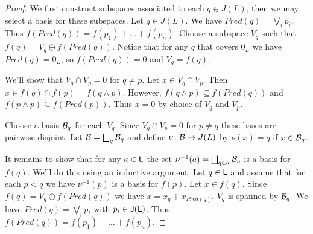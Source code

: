 \begin{proof}
We first construct subspaces associated to each $q\in J(L)$, then we may select a basis for these subspaces.  Let $q\in J(L)$.  We have $Pred(q)=\bigvee_i p_i$.  Thus $f(Pred(q)) = f(p_1)+\ldots + f(p_n)$.    Choose a subspace $V_q$ such that $f(q) = V_q \oplus f(Pred(q))$. Notice that for any $q$ that covers $0_L$ we have $Pred(q)=0_L$, so $f(Pred(q)) = 0$ and $V_q = f(q)$.

We'll show that $V_q\cap V_p=0$ for $q\neq p$.  Let $x\in V_q\cap V_p$.  Then $x\in f(q)\cap f(p) = f(q\wedge p)$.  However, $f(q\wedge p)\subseteq f(Pred(q))$ and $f(p\wedge p)\subseteq f(Pred(p))$.  Thus $x=0$ by choice of $V_q$ and $V_p$.  

Choose a basis ${\mathcal B}_q$ for each $V_q$.  Since $V_q\cap V_p=0$ for $p\neq q$ these bases are pairwise disjoint. Let ${\mathcal B}=\bigsqcup_q {\mathcal B}_q$ and define $\nu\colon {\mathcal B}\to J(L)$ by $\nu(x) = q$ if $x\in {\mathcal B}_q$.


  It remains to show that for any $a\in {\mathsf L}$ the set $\nu^{-1}(a) = \bigsqcup_{q\in a} {\mathcal B}_q $ is a basis for $f(q)$.  We'll do this using an inductive argument.  Let $q\in {\mathsf L}$ and assume that for each $p<q$ we have $\nu^{-1}(p)$ is a basis for $f(p)$.  Let $x\in f(q)$.  Since $f(q) = V_q\oplus f(Pred(q))$ we have $x = x_q+x_{Pred(q)}$.  $V_q$ is spanned by ${\mathcal B}_q$.  We have $Pred(q) = \bigvee_i p_i$ with $p_i\in {\mathsf J}({\mathsf L})$.  Thus $f(Pred(q)) = f(p_1) + \ldots + f(p_n)$.  
  
  
%  
%  
%
\end{proof}


